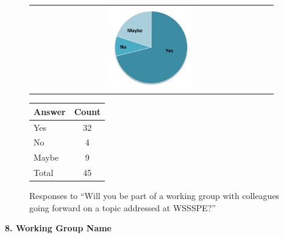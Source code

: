 \begin{figure}[h!]
    \centering
    \begin{tabular}{@{}c@{}}
        \includegraphics[width=0.35\textwidth]{figures/SurveyFig6rev}%
    \end{tabular}
    \qquad
    \begin{tabular}{@{}lc@{}}
    \toprule
    Answer & Count \\
    \midrule
    Yes & 32 \\
    No & 4 \\
    Maybe & 9 \\
    Total & 45 \\
    \bottomrule
    \end{tabular}
    \caption{Responses to ``Will you be part of a working group  with colleagues
    going forward  on a topic addressed at WSSSPE?''}
    \label{fig:SFig6}
\end{figure}




\noindent \textbf{8. Working Group Name}

